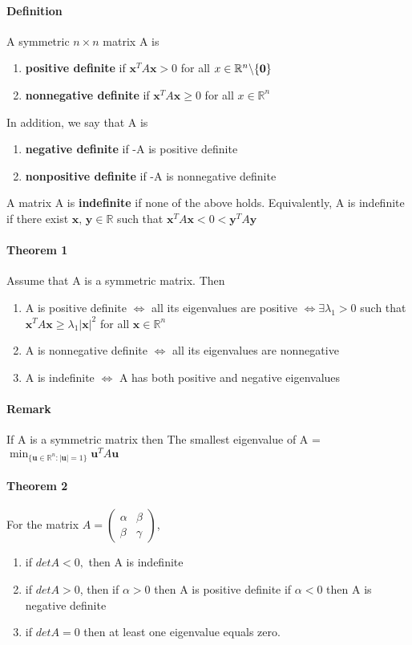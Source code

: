 \documentclass[11pt]{article}
\newcommand{\tb}[1]{\textbf{#1}}
\newcommand{\real}[0]{\mathbb{R}}
\begin{document}
\paragraph{Definition} A symmetric $n \times n$ matrix A is
\begin{enumerate}
    \item \tb{positive definite} if $\tb{x}^T A \tb{x} > 0$ for all $x \in \real^n \symbol{92} \{\tb{0}\}$
    \item \tb{nonnegative definite} if $\tb{x}^T A \tb{x} \geq 0$ for all $x \in \real^n$
\end{enumerate}
In addition, we say that A is
\begin{enumerate}
    \item \tb{negative definite} if -A is positive definite
    \item \tb{nonpositive definite} if -A is nonnegative definite
\end{enumerate}
A matrix A is \tb{indefinite} if none of the above holds. Equivalently, A is indefinite if there exist $\tb{x, y}\in \real$ such that $\tb{x}^TA\tb{x} < 0 < \tb{y}^TA\tb{y}$
\paragraph{Theorem 1} Assume that A is a symmetric matrix. Then \newline
\begin{enumerate}
    \item A is positive definite $\iff$ all its eigenvalues are positive \newline
$\iff \exists \lambda_1 > 0$ such that $\tb{x}^TA\tb{x} \geq \lambda_1|\tb{x}|^2$ for all $\tb{x} \in \real^n $
    \item A is nonnegative definite $\iff$ all its eigenvalues are nonnegative \newline
    \item A is indefinite $\iff$ A has both positive and negative eigenvalues
\end{enumerate}
\paragraph{Remark} If A is a symmetric matrix then \newline
The smallest eigenvalue of A = $\min_{\{\tb{u}\in \real^n: |\tb{u}| = 1\}} \tb{u}^TA\tb{u}$
\paragraph{Theorem 2} For the matrix $A = \begin{pmatrix}
    \alpha & \beta \\
    \beta & \gamma 
\end{pmatrix}$,
\begin{enumerate}
    \item if $det A < 0,$ then A is indefinite
    \item if $det A > 0$, then
    \subitem if $\alpha > 0$ then A is positive definite
    \subitem if $\alpha < 0$ then A is negative definite
    \item if $det A = 0$ then at least one eigenvalue equals zero.
\end{enumerate}
\end{document}
